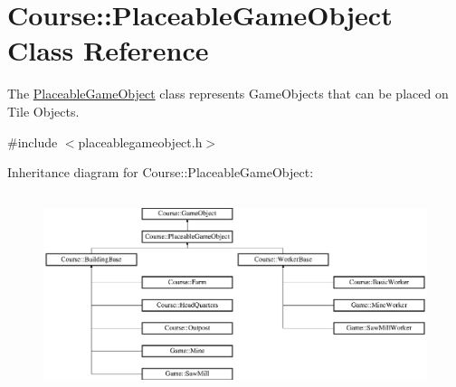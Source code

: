 \hypertarget{classCourse_1_1PlaceableGameObject}{\section{Course\-:\-:Placeable\-Game\-Object Class Reference}
\label{classCourse_1_1PlaceableGameObject}
}


The \hyperlink{classCourse_1_1PlaceableGameObject}{Placeable\-Game\-Object} class represents Game\-Objects that can be placed on Tile Objects.  




{\ttfamily \#include $<$placeablegameobject.\-h$>$}

Inheritance diagram for Course\-:\-:Placeable\-Game\-Object\-:\begin{figure}[H]
\begin{center}
\leavevmode
\includegraphics[height=5.833333cm]{classCourse_1_1PlaceableGameObject}
\end{center}
\end{figure}
